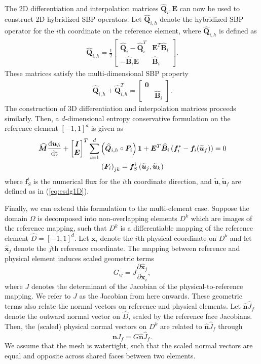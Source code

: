 \documentclass{svjour3}                     %
\renewcommand{\hat}{\widehat}
\renewcommand{\tilde}{\widetilde}
\newcommand{\td}[2]{\frac{{\rm d}#1}{{\rm d}{\rm #2}}}
\newcommand{\pd}[2]{\frac{\partial#1}{\partial#2}}
\newcommand{\LRp}[1]{\left( #1 \right)}
\begin{document}
The 2D differentiation and interpolation matrices $\hat{\bm{Q}}_i, \bm{E}$ can now be used to construct 2D hybridized SBP operators.  Let $\hat{\bm{Q}}_{i,h}$ denote the hybridized SBP operator for the $i$th coordinate on the reference element, where $\hat{\bm{Q}}_{i,h}$ is defined as
\begin{align*}
\hat{\bm{Q}}_{i,h} = \frac{1}{2}\begin{bmatrix}
\hat{\bm{Q}}_i - \hat{\bm{Q}}_i^T & \bm{E}^T\hat{\bm{B}}_i\\
-\hat{\bm{B}}_i\bm{E} & \hat{\bm{B}}_i
\end{bmatrix}.
\end{align*}
These matrices satisfy the multi-dimensional SBP property
\begin{align}
\hat{\bm{Q}}_{i,h} + \hat{\bm{Q}}_{i,h}^T = \begin{bmatrix}
\bm{0} & \\
& \hat{\bm{B}}_i
\end{bmatrix}.
\label{eq:hsbp}
\end{align}
The construction of 3D differentiation and interpolation matrices proceeds similarly.  Then, a $d$-dimensional entropy conservative formulation on the reference element $[-1,1]^d$ is given as 
\begin{gather}
\hat{\bm{M}}\td{\bm{u}_h}{t} + \begin{bmatrix} \bm{I} \\ \bm{E} \end{bmatrix}^T
\sum_{i=1}^d \LRp{\hat{\bm{Q}}_{i,h} \circ \bm{F}_i}\bm{1} + \bm{E}^T\hat{\bm{B}}_i\LRp{\bm{f}_i^*-\bm{f}_i(\tilde{\bm{u}}_f)} = 0 \label{eq:esdgref}\\
\LRp{\bm{F}_i}_{jk} = \bm{f}^i_S\LRp{\tilde{\bm{u}}_j,\tilde{\bm{u}}_k}
\end{gather}
where $\bm{f}^i_S$ is the numerical flux for the $i$th coordinate direction, and $\tilde{\bm{u}},\tilde{\bm{u}}_f$ are defined as in (\ref{eq:esdg1D}).  

Finally, we can extend this formulation to the multi-element case.  Suppose the domain $\Omega$ is decomposed into non-overlapping elements $D^k$ which are images of the reference mapping, such that $D^k$ is a differentiable mapping of the reference element $\hat{D} = [-1,1]^d$.  Let $\bm{x}_i$ denote the $i$th physical coordinate on $D^k$ and let $\hat{\bm{x}}_j$ denote the $j$th reference coordinate.  The mapping between reference and physical element induces scaled geometric terms 
\[
G_{ij} = J\pd{\hat{\bm{x}}_j}{\bm{x}_i},
\]
where $J$ denotes the determinant of the Jacobian of the physical-to-reference mapping.  We refer to $J$ as the Jacobian from here onwards.
These geometric terms also relate the normal vectors on reference and physical elements.  Let $\hat{\bm{n}}\hat{J}_f$ denote the outward normal vector on $\hat{D}$, scaled by the reference face Jacobians.  Then, the (scaled) physical normal vectors on $D^k$ are related to $\hat{\bm{n}}\hat{J}_f$ through
\[
\bm{n}J_f = G\hat{\bm{n}}\hat{J}_f.
\]
We assume that the mesh is watertight, such that the scaled normal vectors are equal and opposite across shared faces between two elements.  
\end{document}
